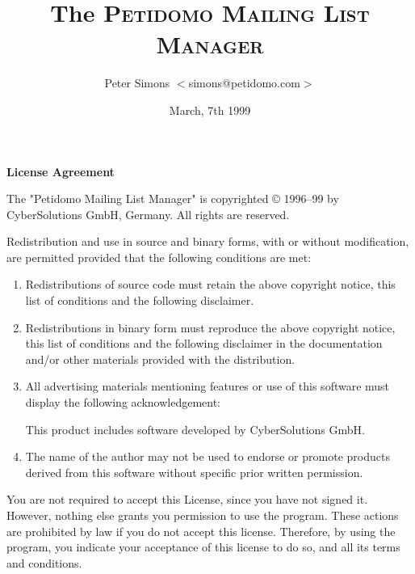 \documentclass[a4paper]{report}
\newcommand{\PetidomoM}{{\scshape Peti\-domo Mail\-ing List Ma\-nager}}
\begin{document}
\sloppy
\pagestyle{empty}

%
%
\title{The \PetidomoM}
\author{Peter Simons $<$simons@petidomo.com$>$}
\date{March, 7th 1999}
\maketitle

%
%
\centerline{\huge\bf License Agreement}

\bigskip

\noindent
The "Petidomo Mailing List Manager" is copyrighted \copyright{} 1996--99 by
CyberSolutions GmbH, Germany. All rights are reserved.

\medskip

\noindent
Redistribution and use in source and binary forms, with or without
modification, are permitted provided that the following conditions
are met:

\begin{enumerate}

\item Redistributions of source code must retain the above copyright
   notice, this list of conditions and the following disclaimer.

\item Redistributions in binary form must reproduce the above copyright
   notice, this list of conditions and the following disclaimer in the
   documentation and/or other materials provided with the distribution.

\item All advertising materials mentioning features or use of this software
   must display the following acknowledgement:

     \centerline{This product includes software developed by CyberSolutions GmbH.}

\item The name of the author may not be used to endorse or promote products
   derived from this software without specific prior written permission.

\end{enumerate}

\noindent
You are not required to accept this License, since you have not signed
it. However, nothing else grants you permission to use the program.
These actions are prohibited by law if you do not accept this license.
Therefore, by using the program, you indicate your acceptance of this
license to do so, and all its terms and conditions.
\end{document}
